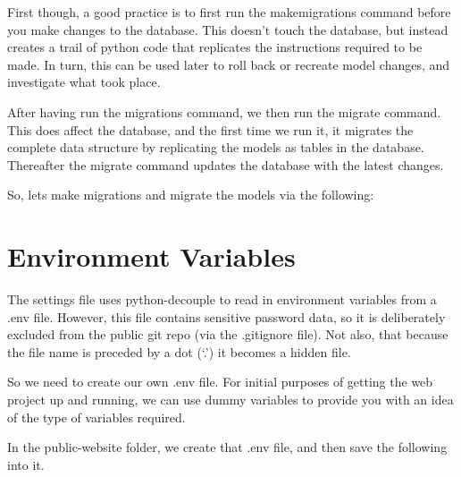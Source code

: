 \documentclass[letterpaper,10pt,english]{sphinxmanual}
\begin{document}
First though, a good practice is to first run the makemigrations command before you make changes to the database.
This doesn’t touch the database, but instead creates a trail of python code that replicates the instructions required to be made.
In turn, this can be used later to roll back or recreate model changes, and investigate what took place.

After having run the migrations command, we then run the migrate command.
This does affect the database, and the first time we run it, it migrates the complete data structure by replicating the models as tables in the database.
Thereafter the migrate command updates the database with the latest changes.

So, lets make migrations and migrate the models via the following:

\begin{sphinxVerbatim}[commandchars=\\\{\}]
 
  
  

 
  
  
\end{sphinxVerbatim}


\section{Environment Variables}
\label{\detokenize{guide/06_environment-variables:environment-variables}}\label{\detokenize{guide/06_environment-variables::doc}}
The settings file uses python-decouple to read in environment variables from a .env file.  However, this file contains sensitive password data, so it is deliberately excluded from the public git repo (via the .gitignore file).  Not also, that because the file name is preceded by a dot (‘.’) it becomes a hidden file.

So we need to create our own .env file.  For initial purposes of getting the web project up and running, we can use dummy variables to provide you with an idea of the type of variables required.

In the public-website folder, we create that .env file, and then save the following into it.
\end{document}
